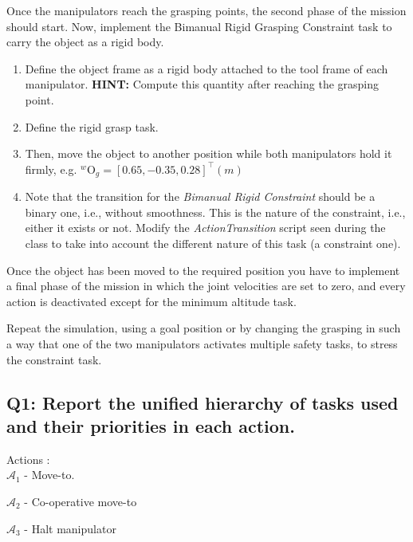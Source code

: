 \documentclass{article}
\begin{document}
Once the manipulators reach the grasping points, the second phase of the mission should start. Now, implement the Bimanual Rigid Grasping Constraint task to carry the object as a rigid body. 
\begin{enumerate}
	\item Define the object frame as a rigid body attached to the tool frame of each manipulator. \textbf{HINT:} Compute this quantity after reaching the grasping point.
	\item Define the rigid grasp task.
	\item Then, move the object to another position while both manipulators hold it firmly, e.g. $ ^{w}\textrm{O}_{g} = [0.65, -0.35, 0.28]^{\top}(m)$
	\item Note that the transition for the \textit{Bimanual Rigid Constraint} should be a binary one, i.e., without smoothness. This is the nature of the constraint, i.e., either it exists or not. Modify the \emph{ActionTransition} script seen during the class to take into account the different nature of this task (a constraint one).
	
	
\end{enumerate}
 
Once the object has been moved to the required position you have to implement a final phase of the mission in which the joint velocities are set to zero, and every action is deactivated except for the minimum altitude task.

Repeat the simulation, using a goal position or by changing the grasping in such a way that one of the two manipulators activates multiple safety tasks, to stress the constraint task.

\subsection{Q1: Report the unified hierarchy of tasks used and their priorities in each action.}


Actions :\\ 

$\mathcal{A}_{1}$ - Move-to.


$\mathcal{A}_{2}$ - Co-operative move-to

$\mathcal{A}_{3}$ - Halt manipulator
\end{document}
